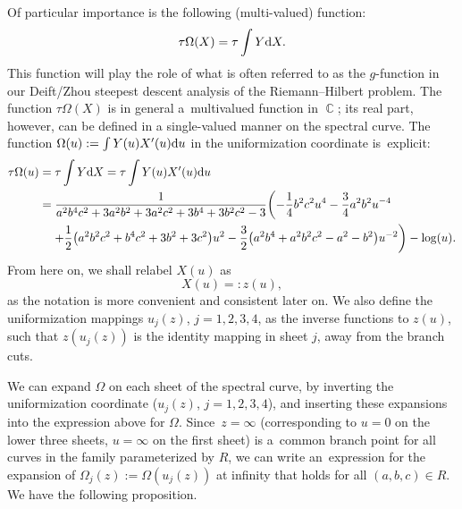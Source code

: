 \documentclass[pdftex]{sigma}
\DeclareMathOperator{\CC}{\mathbb{C}}
\numberwithin{equation}{section}
\begin{document}
Of particular importance is the following (multi-valued) function:
 \begin{equation*}
 \tau\Omega(X) = \tau\int Y {\rm d}X.
 \end{equation*}
This function will play the role of what is often referred to as the $g$-function in our Deift/Zhou steepest descent analysis of the Riemann--Hilbert problem. The function $\tau\Omega(X)$ is in general a~multivalued function in $\CC$; its real part, however, can be defined in a single-valued manner on the spectral curve. The function $\Omega(u) := \int Y(u) X'(u) {\rm d}u$ in the uniformization coordinate is~explicit:
 \begin{align}
 \tau \Omega(u)={}& \tau \int Y {\rm d}X = \tau \int Y(u) X'(u) {\rm d}u \nonumber\\
={}& \frac{1}{a^2b^4c^2 + 3a^2b^2 + 3a^2c^2 + 3b^4 + 3b^2c^2 - 3}\biggl(-\frac{1}{4} b^2c^2 u^4 - \frac{3}{4}a^2b^2 u^{-4}\label{Omega-uniformizer}\\
 &{}{+} \frac{1}{2}\bigl(a^2b^2c^2 + b^4c^2 + 3b^2 + 3c^2\bigr)u^2- \frac{3}{2}\bigl( a^2b^4 + a^2b^2c^2 - a^2 - b^2\bigr)u^{-2}\biggr) - \log(u).\nonumber
 \end{align}
From here on, we shall relabel $X(u)$ as
 \begin{equation*}
 X(u) =: z(u),
 \end{equation*}
as the notation is more convenient and consistent later on. We also define the uniformization mappings $u_j(z)$, $j=1,2,3,4$, as the inverse functions to $z(u)$, such that $z(u_j(z))$ is the identity mapping in sheet $j$, away from the branch cuts.

We can expand $\Omega$ on each sheet of the spectral curve, by inverting the uniformization coordinate ($u_j(z)$, $j=1,2,3,4$), and inserting these expansions into the expression above for $\Omega$. Since~${z=\infty}$ (corresponding to $u=0$ on the lower three sheets, $u=\infty$ on the first sheet) is a~common branch point for all curves in the family parameterized by $R$, we can write an~expression for the expansion of $\Omega_j(z) := \Omega(u_j(z))$ at infinity that holds for all $(a,b,c) \in R$. We have the following proposition.
\end{document}
